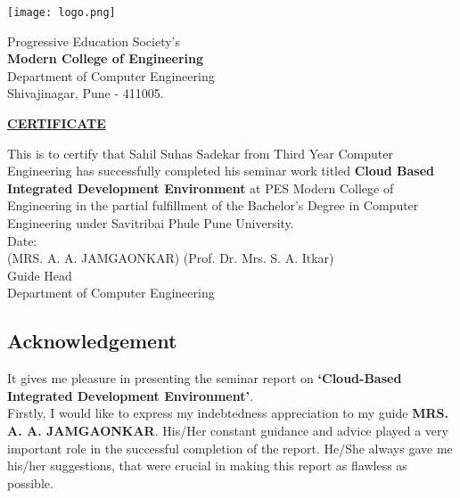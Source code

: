 \documentclass[12pt,a4paper,final]{report}
\begin{document}
\thispagestyle{empty}
\vspace*{1.3cm}
\begin{center}
\texttt{[image: logo.png]}
\end{center}
\begin{center}
\Large
Progressive Education Society's \\
\textbf{Modern College of Engineering} \\
Department of Computer Engineering\\
Shivajinagar, Pune - 411005. \\
\vspace{1cm}

\underline{\textbf{CERTIFICATE}}
\end{center}
\normalsize
\vspace{0.5cm}
This is to certify that Sahil Suhas Sadekar from Third Year Computer 
Engineering has successfully completed his seminar work titled \textbf{Cloud Based Integrated Development Environment} at PES Modern College of Engineering in the partial fulfillment of the Bachelor's Degree in 
Computer Engineering under Savitribai Phule Pune University. \vspace{1cm}\\ 
Date: \vspace{1cm} \\
(MRS. A. A. JAMGAONKAR)
\hspace*{5.5cm}(Prof. Dr. Mrs. S. A. Itkar) \\
\hspace*{0.5cm} Guide 	 
\hspace{11.0cm}Head \\
\hspace*{10cm}Department of Computer Engineering \\

\thispagestyle{empty}
\Large
\begin{center}
\chapter*{\centering Acknowledgement}
\end{center}
\normalsize
It gives me pleasure in presenting the seminar report on \textbf{`Cloud-Based Integrated Development Environment'}.\\

Firstly, I would like to express my indebtedness appreciation to my guide \textbf{MRS. A. A. JAMGAONKAR}. His/Her constant guidance and advice played a very important role  in the successful completion of the report. He/She always gave me his/her suggestions, that were crucial in making this report as flawless as possible.\\
\end{document}
